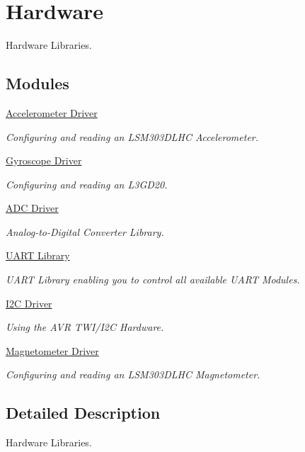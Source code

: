 \hypertarget{group___hardware}{\section{Hardware}
\label{group___hardware}
}


Hardware Libraries.  


\subsection*{Modules}
\begin{DoxyCompactItemize}
\item 
\hyperlink{group__acc}{Accelerometer Driver}
\begin{DoxyCompactList}\small\item\em Configuring and reading an L\-S\-M303\-D\-L\-H\-C Accelerometer. \end{DoxyCompactList}\item 
\hyperlink{group__gyro}{Gyroscope Driver}
\begin{DoxyCompactList}\small\item\em Configuring and reading an L3\-G\-D20. \end{DoxyCompactList}\item 
\hyperlink{group__adc}{A\-D\-C Driver}
\begin{DoxyCompactList}\small\item\em Analog-\/to-\/\-Digital Converter Library. \end{DoxyCompactList}\item 
\hyperlink{group__uart}{U\-A\-R\-T Library}
\begin{DoxyCompactList}\small\item\em U\-A\-R\-T Library enabling you to control all available U\-A\-R\-T Modules. \end{DoxyCompactList}\item 
\hyperlink{group__twi}{I2\-C Driver}
\begin{DoxyCompactList}\small\item\em Using the A\-V\-R T\-W\-I/\-I2\-C Hardware. \end{DoxyCompactList}\item 
\hyperlink{group__mag}{Magnetometer Driver}
\begin{DoxyCompactList}\small\item\em Configuring and reading an L\-S\-M303\-D\-L\-H\-C Magnetometer. \end{DoxyCompactList}\end{DoxyCompactItemize}


\subsection{Detailed Description}
Hardware Libraries. 